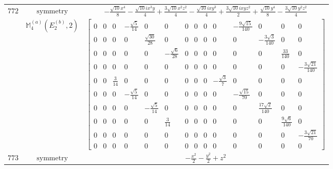 \documentclass[fleqn,8pt,landscape]{jsarticle}
\begin{document}
\begin{longtable}{ccc}
$ 772 $ & $ \text{symmetry} $ & $ - \frac{\sqrt{10} x^{4}}{8} - \frac{\sqrt{10} i x^{3} y}{4} + \frac{3 \sqrt{10} x^{2} z^{2}}{4} - \frac{\sqrt{10} i x y^{3}}{4} + \frac{3 \sqrt{10} i x y z^{2}}{2} + \frac{\sqrt{10} y^{4}}{8} - \frac{3 \sqrt{10} y^{2} z^{2}}{4} $ \\
$  $ & $ \mathbb{M}_{4}^{(a)}(E_{2}^{(b)},2) $ & $ \begin{bmatrix} 0 & 0 & 0 & - \frac{\sqrt{5}}{14} & 0 & 0 & 0 & 0 & 0 & 0 & - \frac{9 \sqrt{15}}{140} & 0 & 0 & 0 \\ 0 & 0 & 0 & 0 & \frac{\sqrt{30}}{28} & 0 & 0 & 0 & 0 & 0 & 0 & - \frac{3 \sqrt{3}}{140} & 0 & 0 \\ 0 & 0 & 0 & 0 & 0 & - \frac{\sqrt{6}}{28} & 0 & 0 & 0 & 0 & 0 & 0 & \frac{33}{140} & 0 \\ 0 & 0 & 0 & 0 & 0 & 0 & 0 & 0 & 0 & 0 & 0 & 0 & 0 & - \frac{3 \sqrt{21}}{140} \\ 0 & 0 & \frac{3}{14} & 0 & 0 & 0 & 0 & 0 & 0 & - \frac{\sqrt{3}}{7} & 0 & 0 & 0 & 0 \\ 0 & 0 & 0 & - \frac{\sqrt{5}}{14} & 0 & 0 & 0 & 0 & 0 & 0 & - \frac{\sqrt{15}}{70} & 0 & 0 & 0 \\ 0 & 0 & 0 & 0 & - \frac{\sqrt{5}}{14} & 0 & 0 & 0 & 0 & 0 & 0 & \frac{17 \sqrt{2}}{140} & 0 & 0 \\ 0 & 0 & 0 & 0 & 0 & \frac{3}{14} & 0 & 0 & 0 & 0 & 0 & 0 & \frac{9 \sqrt{6}}{140} & 0 \\ 0 & 0 & 0 & 0 & 0 & 0 & 0 & 0 & 0 & 0 & 0 & 0 & 0 & - \frac{3 \sqrt{21}}{70} \\ 0 & 0 & 0 & 0 & 0 & 0 & 0 & 0 & 0 & 0 & 0 & 0 & 0 & 0 \end{bmatrix} $ \\ \hline
$ 773 $ & $ \text{symmetry} $ & $ - \frac{x^{2}}{2} - \frac{y^{2}}{2} + z^{2} $ \\

\end{longtable}
\end{document}
